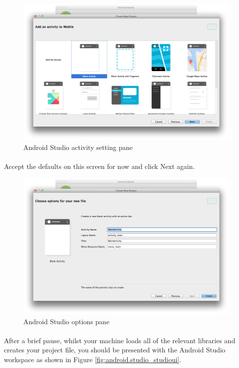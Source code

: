 \begin{figure}[H]
\centering
\includegraphics[width=\textwidth]{images/android-studio_06_activity}
\caption{Android Studio activity setting pane}
\label{fig:android.studio_activity}
\end{figure}

\paragraph{} Accept the defaults on this screen for now and click Next again.

\begin{figure}[H]
\centering
\includegraphics[width=\textwidth]{images/android-studio_07_options}
\caption{Android Studio options pane}
\label{fig:android.studio_options}
\end{figure}

\paragraph{} After a brief pause, whilst your machine loads all of the relevant libraries and creates your project file, you should be presented with the Android Studio workspace as shown in Figure \ref{fig:android.studio_studioui}.

